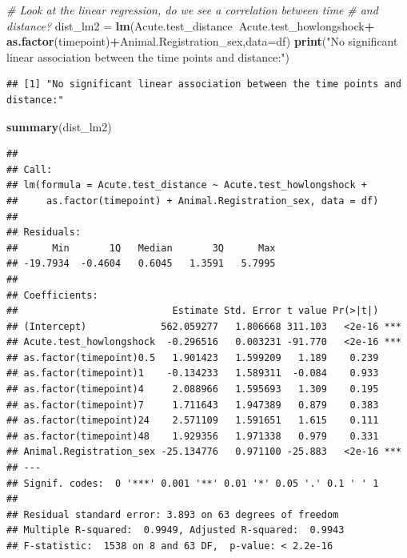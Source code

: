 \documentclass[]{article}
\newenvironment{Shaded}{\begin{snugshade}}{\end{snugshade}}
\newcommand{\KeywordTok}[1]{\textcolor[rgb]{0.13,0.29,0.53}{\textbf{#1}}}
\newcommand{\DataTypeTok}[1]{\textcolor[rgb]{0.13,0.29,0.53}{#1}}
\newcommand{\StringTok}[1]{\textcolor[rgb]{0.31,0.60,0.02}{#1}}
\newcommand{\CommentTok}[1]{\textcolor[rgb]{0.56,0.35,0.01}{\textit{#1}}}
\newcommand{\OperatorTok}[1]{\textcolor[rgb]{0.81,0.36,0.00}{\textbf{#1}}}
\newcommand{\NormalTok}[1]{#1}
\begin{document}
\begin{Shaded}
\begin{Highlighting}[]
\CommentTok{# Look at the linear regression, do we see a correlation between time}
\CommentTok{# and distance?}
\NormalTok{dist_lm2 =}\StringTok{ }\KeywordTok{lm}\NormalTok{(Acute.test_distance}\OperatorTok{~}\NormalTok{Acute.test_howlongshock}\OperatorTok{+}
\StringTok{                }\KeywordTok{as.factor}\NormalTok{(timepoint)}\OperatorTok{+}\NormalTok{Animal.Registration_sex,}\DataTypeTok{data=}\NormalTok{df)}
\KeywordTok{print}\NormalTok{(}\StringTok{"No significant linear association between the time points and distance:"}\NormalTok{)}
\end{Highlighting}
\end{Shaded}

\begin{verbatim}
## [1] "No significant linear association between the time points and distance:"
\end{verbatim}

\begin{Shaded}
\begin{Highlighting}[]
\KeywordTok{summary}\NormalTok{(dist_lm2)}
\end{Highlighting}
\end{Shaded}

\begin{verbatim}
## 
## Call:
## lm(formula = Acute.test_distance ~ Acute.test_howlongshock + 
##     as.factor(timepoint) + Animal.Registration_sex, data = df)
## 
## Residuals:
##      Min       1Q   Median       3Q      Max 
## -19.7934  -0.4604   0.6045   1.3591   5.7995 
## 
## Coefficients:
##                           Estimate Std. Error t value Pr(>|t|)    
## (Intercept)             562.059277   1.806668 311.103   <2e-16 ***
## Acute.test_howlongshock  -0.296516   0.003231 -91.770   <2e-16 ***
## as.factor(timepoint)0.5   1.901423   1.599209   1.189    0.239    
## as.factor(timepoint)1    -0.134233   1.589311  -0.084    0.933    
## as.factor(timepoint)4     2.088966   1.595693   1.309    0.195    
## as.factor(timepoint)7     1.711643   1.947389   0.879    0.383    
## as.factor(timepoint)24    2.571109   1.591651   1.615    0.111    
## as.factor(timepoint)48    1.929356   1.971338   0.979    0.331    
## Animal.Registration_sex -25.134776   0.971100 -25.883   <2e-16 ***
## ---
## Signif. codes:  0 '***' 0.001 '**' 0.01 '*' 0.05 '.' 0.1 ' ' 1
## 
## Residual standard error: 3.893 on 63 degrees of freedom
## Multiple R-squared:  0.9949, Adjusted R-squared:  0.9943 
## F-statistic:  1538 on 8 and 63 DF,  p-value: < 2.2e-16
\end{verbatim}
\end{document}
